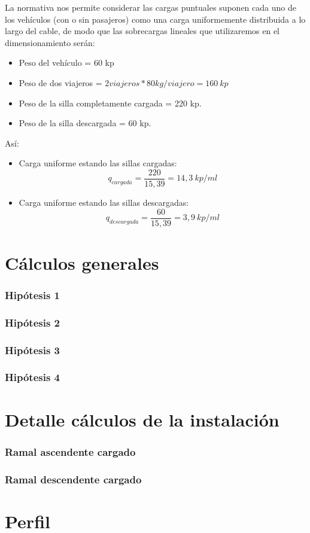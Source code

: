 \documentclass[a4paper,11pt]{article}
\begin{document}
\par La normativa nos permite considerar las cargas puntuales suponen cada uno de los vehículos (con o sin pasajeros) como una carga uniformemente distribuida a lo largo del cable, de modo que las sobrecargas lineales que utilizaremos en el dimensionamiento serán:\\
\begin{itemize}
\item Peso del vehículo = 60 kp
\item Peso de dos viajeros = $2 viajeros * 80 kg/viajero = 160~kp$
\item Peso de la silla completamente cargada = 220 kp.
\item Peso de la silla descargada = 60 kp.
\end{itemize}
Así:
\begin{itemize}
\item Carga uniforme estando las sillas cargadas:
\begin{displaymath}
q_{cargada} = \frac{220}{15,39} = 14,3~kp/ml 
\end{displaymath}
\item Carga uniforme estando las sillas descargadas:
\begin{displaymath}
q_{descargada} = \frac{60}{15,39} = 3,9~kp/ml 
\end{displaymath}
\end{itemize}
\part{Cálculos generales}
\section{Hipótesis 1}
\section{Hipótesis 2}
\section{Hipótesis 3}
\section{Hipótesis 4}
\part{Detalle cálculos de la instalación}
\section{Ramal ascendente cargado}
\section{Ramal descendente cargado}
\part{Perfil}
\end{document}
